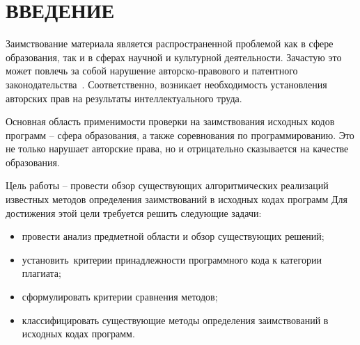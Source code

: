 \section*{ВВЕДЕНИЕ}

Заимствование материала является распространенной проблемой как в сфере образования, так и в сферах научной и культурной деятельности. Зачастую это может повлечь за собой нарушение авторско-правового и патентного законодательства~\cite{law}. Соответственно, возникает необходимость установления авторских прав на результаты интеллектуального труда.

Основная область применимости проверки на заимствования исходных кодов программ -- сфера образования, а также соревнования по программированию. Это не только нарушает авторские права, но и отрицательно сказывается на качестве образования.

Цель работы -- провести обзор существующих алгоритмических реализаций известных методов определения заимствований в исходных кодах программ
Для достижения этой цели требуется решить следующие задачи:
\begin{itemize}[label*=---]
	\item провести анализ предметной области и обзор существующих решений;
	\item установить критерии принадлежности программного кода к категории плагиата;
	\item сформулировать критерии сравнения методов;
	\item классифицировать существующие методы определения заимствований в исходных кодах программ.
\end{itemize}

\pagebreak